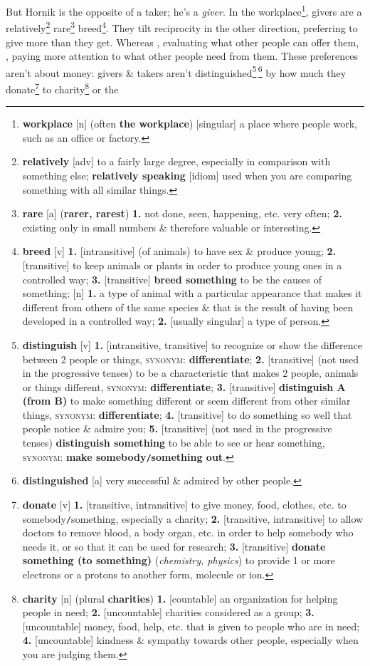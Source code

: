 \documentclass[oneside]{book}
\numberwithin{equation}{section}
\begin{document}
But Hornik is the opposite of a taker; he's a \textit{giver}. In the workplace\footnote{\textbf{workplace} [n] (often \textbf{the workplace}) [singular] a place where people work, such as an office or factory.}, givers are a relatively\footnote{\textbf{relatively} [adv] to a fairly large degree, especially in comparison with something else; \textbf{relatively speaking} [idiom] used when you are comparing something with all similar things.} rare\footnote{\textbf{rare} [a] (\textbf{rarer, rarest}) \textbf{1.} not done, seen, happening, etc. very often; \textbf{2.} existing only in small numbers \& therefore valuable or interesting.} breed\footnote{\textbf{breed} [v] \textbf{1.} [intransitive] (of animals) to have sex \& produce young; \textbf{2.} [transitive] to keep animals or plants in order to produce young ones in a controlled way; \textbf{3.} [transitive] \textbf{breed something} to be the causes of something; [n] \textbf{1.} a type of animal with a particular appearance that makes it different from others of the same species \& that is the result of having been developed in a controlled way; \textbf{2.} [usually singular] a type of person.}. They tilt reciprocity in the other direction, preferring to give more than they get. Whereas , evaluating what other people can offer them, , paying more attention to what other people need from them. These preferences aren't about money: givers \& takers aren't distinguished\footnote{\textbf{distinguish} [v] \textbf{1.} [intransitive, transitive] to recognize or show the difference between 2 people or things, \textsc{synonym}: \textbf{differentiate}; \textbf{2.} [transitive] (not used in the progressive tenses) to be a characteristic that makes 2 people, animals or things different, \textsc{synonym}: \textbf{differentiate}; \textbf{3.} [transitive] \textbf{distinguish A (from B)} to make something different or seem different from other similar things, \textsc{synonym}: \textbf{differentiate}; \textbf{4.} [transitive] to do something so well that people notice \& admire you; \textbf{5.} [transitive] (not used in the progressive tenses) \textbf{distinguish  something} to be able to see or hear something, \textsc{synonym}: \textbf{make somebody\texttt{/}something out}.}\,\footnote{\textbf{distinguished} [a] very successful \& admired by other people.} by how much they donate\footnote{\textbf{donate} [v] \textbf{1.} [transitive, intransitive] to give money, food, clothes, etc. to somebody\texttt{/}something, especially a charity; \textbf{2.} [transitive, intransitive] to allow doctors to remove blood, a body organ, etc. in order to help somebody who needs it, or so that it can be used for research; \textbf{3.} [transitive] \textbf{donate something (to something)} (\textit{chemistry, physics}) to provide 1 or more electrons or a protons to another form, molecule or ion.} to charity\footnote{\textbf{charity} [n] (plural \textbf{charities}) \textbf{1.} [countable] an organization for helping people in need; \textbf{2.} [uncountable] charities considered as a group; \textbf{3.} [uncountable] money, food, help, etc. that is given to people who are in need; \textbf{4.} [uncountable] kindness \& sympathy towards other people, especially when you are judging them.} or the 
\end{document}
